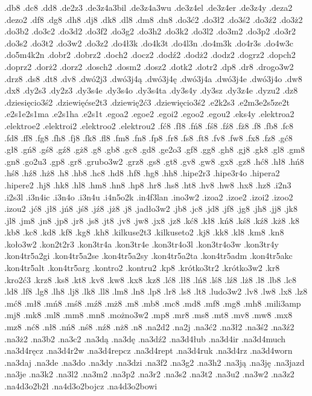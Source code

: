 {.db8
.dc8
.dd8
.de2z3
.de3z4a3bil
.de3z4a3wu
.de3z4el
.de3z4er
.de3z4y
.deza2
.dezo2
.df8
.dg8
.dh8
.dj8
.dk8
.dl8
.dm8
.dn8
.do3ć2
.do3ł2
.do3ś2
.do3ź2
.do3ż2
.do3b2
.do3c2
.do3d2
.do3f2
.do3g2
.do3h2
.do3k2
.do3l2
.do3m2
.do3p2
.do3r2
.do3s2
.do3t2
.do3w2
.do3z2
.do4ł3k
.do4k3t
.do4l3n
.do4m3k
.do4r3s
.do4w3c
.do5m4k2n
.dobr2
.dobrz2
.doch2
.docz2
.dodź2
.dodż2
.dodz2
.dogrz2
.dopch2
.doprz2
.dorż2
.dorz2
.dosch2
.dosm2
.dosz2
.dotk2
.dotr2
.dp8
.dr8
.drogo3w2
.drz8
.ds8
.dt8
.dv8
.dwó2j3
.dwó3j4ą
.dwó3j4ę
.dwó3j4a
.dwó3j4e
.dwó3j4o
.dw8
.dx8
.dy2s3
.dy2z3
.dy3s4e
.dy3s4o
.dy3s4ta
.dy3s4y
.dy3sz
.dy3z4e
.dyzu2
.dz8
.dziesięcio3ś2
.dziewięćse2t3
.dziewię2ć3
.dziewięcio3ś2
.e2k2s3
.e2m3e2s5ze2t
.e2s1e2s1ma
.e2s1ha
.e2s1t
.egoa2
.egoe2
.egoi2
.egoo2
.egou2
.eks4y
.elektroa2
.elektroe2
.elektroi2
.elektroo2
.elektrou2
.fć8
.fł8
.fń8
.fś8
.fź8
.fż8
.f8
.fb8
.fc8
.fd8
.ff8
.fg8
.fh8
.fj8
.fk8
.fl8
.fm8
.fn8
.fp8
.fr8
.fs8
.ft8
.fv8
.fw8
.fx8
.fz8
.gć8
.gł8
.gń8
.gś8
.gź8
.gż8
.g8
.gb8
.gc8
.gd8
.ge2o3
.gf8
.gg8
.gh8
.gj8
.gk8
.gl8
.gm8
.gn8
.go2u3
.gp8
.gr8
.grubo3w2
.grz8
.gs8
.gt8
.gv8
.gw8
.gx8
.gz8
.hć8
.hł8
.hń8
.hś8
.hź8
.hż8
.h8
.hb8
.hc8
.hd8
.hf8
.hg8
.hh8
.hipe2r3
.hipe3r4o
.hipera2
.hipere2
.hj8
.hk8
.hl8
.hm8
.hn8
.hp8
.hr8
.hs8
.ht8
.hv8
.hw8
.hx8
.hz8
.i2n3
.i2s3l
.i3n4ic
.i3n4o
.i3n4u
.i4n5o2k
.in4f3lan
.ino3w2
.izoa2
.izoe2
.izoi2
.izoo2
.izou2
.jć8
.jł8
.jń8
.jś8
.jź8
.jż8
.j8
.jadło3w2
.jb8
.jc8
.jd8
.jf8
.jg8
.jh8
.jj8
.jk8
.jl8
.jm8
.jn8
.jp8
.jr8
.js8
.jt8
.jv8
.jw8
.jx8
.jz8
.kć8
.kł8
.kń8
.kś8
.kź8
.kż8
.k8
.kb8
.kc8
.kd8
.kf8
.kg8
.kh8
.kilkuse2t3
.kilkuseto2
.kj8
.kk8
.kl8
.km8
.kn8
.koło3w2
.kon2t2r3
.kon3tr4a
.kon3tr4e
.kon3tr4o3l
.kon3tr4o3w
.kon3tr4y
.kon4tr5a2gi
.kon4tr5a2se
.kon4tr5a2sy
.kon4tr5a2ta
.kon4tr5adm
.kon4tr5akc
.kon4tr5alt
.kon4tr5arg
.kontro2
.kontru2
.kp8
.krótko3tr2
.krótko3w2
.kr8
.kro2ć3
.krz8
.ks8
.kt8
.kv8
.kw8
.kx8
.kz8
.lć8
.lł8
.lń8
.lś8
.lź8
.lż8
.l8
.lb8
.lc8
.ld8
.lf8
.lg8
.lh8
.lj8
.lk8
.ll8
.lm8
.ln8
.lp8
.lr8
.ls8
.lt8
.ludo3w2
.lv8
.lw8
.lx8
.lz8
.mć8
.mł8
.mń8
.mś8
.mź8
.mż8
.m8
.mb8
.mc8
.md8
.mf8
.mg8
.mh8
.mili3amp
.mj8
.mk8
.ml8
.mm8
.mn8
.możno3w2
.mp8
.mr8
.ms8
.mt8
.mv8
.mw8
.mx8
.mz8
.nć8
.nł8
.nń8
.nś8
.nź8
.nż8
.n8
.na2d2
.na2j
.na3ć2
.na3ł2
.na3ś2
.na3ź2
.na3ż2
.na3b2
.na3c2
.na3dą
.na3dę
.na3dź2
.na3d4łub
.na3d4ir
.na3d4much
.na3d4ręcz
.na3d4r2w
.na3d4repcz
.na3d4rept
.na3d4ruk
.na3d4rz
.na3d4worn
.na3daj
.na3de
.na3do
.na3dy
.na3dzi
.na3f2
.na3g2
.na3h2
.na3ją
.na3ję
.na3jazd
.na3je
.na3k2
.na3l2
.na3m2
.na3p2
.na3r2
.na3s2
.na3t2
.na3u2
.na3w2
.na3z2
.na4d3o2b2ł
.na4d3o2bojcz
.na4d3o2bowi
}

